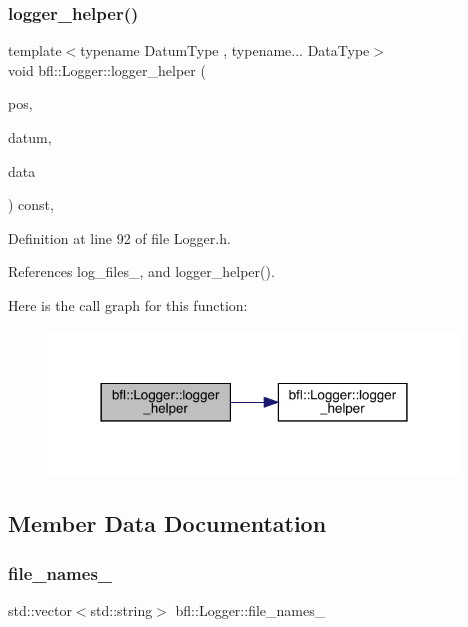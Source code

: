 \subsubsection{\texorpdfstring{logger\+\_\+helper()}{logger\_helper()}\hspace{0.1cm}{\footnotesize\ttfamily [4/4]}}
{\footnotesize\ttfamily template$<$typename Datum\+Type , typename... Data\+Type$>$ \\
void bfl\+::\+Logger\+::logger\+\_\+helper (\begin{DoxyParamCaption}\item[{const size\+\_\+t}]{pos,  }\item[{Datum\+Type}]{datum,  }\item[{Data\+Type...}]{data }\end{DoxyParamCaption}) const\hspace{0.3cm}{\ttfamily [inline]}, {\ttfamily [private]}}



Definition at line 92 of file Logger.\+h.



References log\+\_\+files\+\_\+, and logger\+\_\+helper().

Here is the call graph for this function\+:
\nopagebreak
\begin{figure}[H]
\begin{center}
\leavevmode
\includegraphics[width=309pt]{classbfl_1_1Logger_a9ac71d17bc482feeda35c6d91396cac2_cgraph}
\end{center}
\end{figure}


\subsection{Member Data Documentation}
\mbox{\label{classbfl_1_1Logger_ac6cb274f1b9dc648d7762fee78358bcd}} 
\subsubsection{\texorpdfstring{file\+\_\+names\+\_\+}{file\_names\_}}
{\footnotesize\ttfamily std\+::vector$<$std\+::string$>$ bfl\+::\+Logger\+::file\+\_\+names\+\_\+\hspace{0.3cm}{\ttfamily [private]}}



